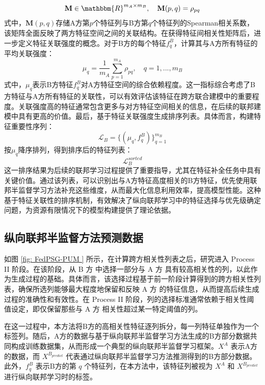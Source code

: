 \begin{equation}
	\mathbf{M} \in \mathbbm{R}^{m_A \times m_B}, \quad \mathbf{M}(p,q) = \rho_{pq}
\end{equation}
式中，$\mathbf{M}(p,q)$存储A方第$p$个特征列与B方第$q$个特征列的Spearman相关系数，该矩阵全面反映了两方特征空间之间的关联结构。在获得特征间相关性矩阵后，进一步定义特征关联强度的概念。对于B方的每个特征$f^B_q$，计算其与A方所有特征的平均关联强度：
\begin{equation}
	\mu_q = \frac{1}{m_A} \sum_{p=1}^{m_A} \rho_{pq}, \quad q=1,...,m_B
\end{equation}
式中，$\mu_q$表示B方特征$f^B_q$对A方特征空间的综合依赖程度。这一指标综合考虑了B方特征与A方所有特征的关联性，可以有效评估该特征在跨方联合建模中的重要程度。关联强度高的特征通常包含更多与对方特征空间相关的信息，在后续的联邦建模中具有更高的价值。最后，基于特征关联强度生成排序列表。具体而言，构建特征重要性序列：
\begin{equation}
	\mathcal{L}_B = \{(\mu_q, f^B_q)\}_{q=1}^{m_B}
\end{equation}
按$\mu_q$降序排列，得到排序后的特征列表：
\begin{equation}
	\mathcal{L}_B^{sorted}
\end{equation}
这一排序结果为后续的联邦学习过程提供了重要指导，尤其在特征补全任务中具有关键价值。通过该列表，可以识别出与A方特征高度相关的B方特征，优先使用联邦半监督学习方法补充这些维度，从而最大化信息利用效率，提高模型性能。这种基于特征关联性的排序机制，有效解决了纵向联邦学习中的特征选择与优先级确定问题，为资源有限情况下的模型构建提供了理论依据。
\subsection{纵向联邦半监督方法预测数据}
如图 \ref{fig: FedPSG-PUM } 所示，在计算跨方相关性列表之后，研究进入 Process II 阶段。在该阶段，从 B 方 中选择一部分与 A 方 具有较高相关性的列，以此作为生成过程的基础。具体而言，该选择过程基于前一阶段计算得到的跨方相关性列表，确保所选列能够最大程度地保留和反映 A 方 的特征信息，从而提高后续生成过程的准确性和有效性。在 Process II 阶段，列的选择标准通常依赖于相关性阈值设定，即仅保留那些与 A 方 相关性超过某一特定阈值的列。

在这一过程中，本方法将B方的高相关性特征逐列拆分，每一列特征单独作为一个标签列。随后，A方的数据与基于纵向联邦半监督学习方法生成的B方部分数据共同构成训练数据集，从而形成一个典型的纵向联邦半监督学习框架。$X^A$ 表示A方的数据，而 ${{X}^{{{B}_{predict}}}}$ 代表通过纵向联邦半监督学习方法推测得到的B方部分数据。此外，$f_{q}^{B}$ 表示B方的第 $q$ 个特征列，在本方法中，该特征列被视为 $X^A$ 和 ${{X}^{{{B}_{predict}}}}$ 进行纵向联邦学习时的标签。

